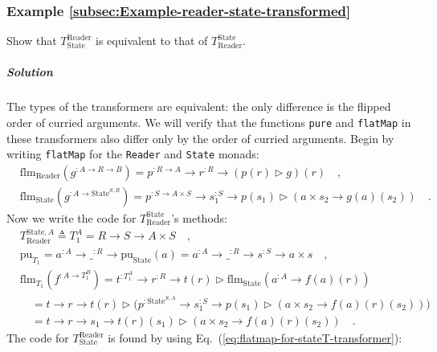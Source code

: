 \subsubsection{Example \label{subsec:Example-reader-state-transformed}\ref{subsec:Example-reader-state-transformed}}

Show that $T_{\text{State}}^{\text{Reader}}$ is equivalent to that
of $T_{\text{Reader}}^{\text{State}}$.

\subparagraph{Solution}

The types of the transformers are equivalent: the only difference
is the flipped order of curried arguments. We will verify that the
functions \lstinline!pure! and \lstinline!flatMap! in these transformers
also differ only by the order of curried arguments. Begin by writing
\lstinline!flatMap! for the \lstinline!Reader! and \lstinline!State!
monads:
\begin{align*}
 & \text{flm}_{\text{Reader}}(g^{:A\rightarrow R\rightarrow B})=p^{:R\rightarrow A}\rightarrow r^{:R}\rightarrow(p(r)\triangleright g)(r)\quad,\\
 & \text{flm}_{\text{State}}(g^{:A\rightarrow\text{State}^{S,B}})=p^{:S\rightarrow A\times S}\rightarrow s_{1}^{:S}\rightarrow p(s_{1})\triangleright(a\times s_{2}\rightarrow g(a)(s_{2}))\quad.
\end{align*}
Now we write the code for $T_{\text{Reader}}^{\text{State}}$\textsf{'}s methods:
\begin{align*}
 & T_{\text{Reader}}^{\text{State},A}\triangleq T_{1}^{A}=R\rightarrow S\rightarrow A\times S\quad,\\
 & \text{pu}_{T_{1}}=a^{:A}\rightarrow\_^{:R}\rightarrow\text{pu}_{\text{State}}(a)=a^{:A}\rightarrow\_^{:R}\rightarrow s^{:S}\rightarrow a\times s\quad,\\
 & \text{flm}_{T_{1}}(f^{:A\rightarrow T_{1}^{B}})=t^{:T_{1}^{A}}\rightarrow r^{:R}\rightarrow t(r)\triangleright\text{flm}_{\text{State}}(a^{:A}\rightarrow f(a)(r))\\
 & \quad=t\rightarrow r\rightarrow t(r)\triangleright\big(p^{:\text{State}^{S,A}}\rightarrow s_{1}^{:S}\rightarrow p(s_{1})\triangleright(a\times s_{2}\rightarrow f(a)(r)(s_{2}))\big)\\
 & \quad=t\rightarrow r\rightarrow s_{1}\rightarrow t(r)(s_{1})\triangleright(a\times s_{2}\rightarrow f(a)(r)(s_{2}))\quad.
\end{align*}
The code for $T_{\text{State}}^{\text{Reader}}$ is found by using
Eq.~(\ref{eq:flatmap-for-stateT-transformer}):
